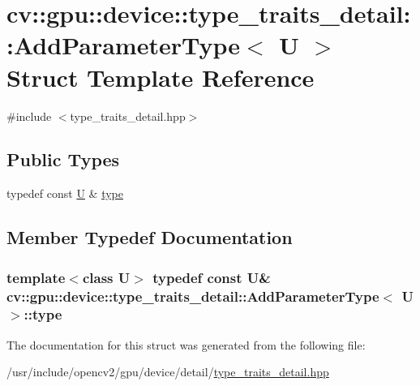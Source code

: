 \hypertarget{structcv_1_1gpu_1_1device_1_1type__traits__detail_1_1AddParameterType}{\section{cv\-:\-:gpu\-:\-:device\-:\-:type\-\_\-traits\-\_\-detail\-:\-:Add\-Parameter\-Type$<$ U $>$ Struct Template Reference}
\label{structcv_1_1gpu_1_1device_1_1type__traits__detail_1_1AddParameterType}
}


{\ttfamily \#include $<$type\-\_\-traits\-\_\-detail.\-hpp$>$}

\subsection*{Public Types}
\begin{DoxyCompactItemize}
\item 
typedef const \hyperlink{core__c_8h_aa9c521f41af9a5191e5e4b6ffbae211a}{U} \& \hyperlink{structcv_1_1gpu_1_1device_1_1type__traits__detail_1_1AddParameterType_ae21d6957928c27f53fadf3519a43140a}{type}
\end{DoxyCompactItemize}


\subsection{Member Typedef Documentation}
\hypertarget{structcv_1_1gpu_1_1device_1_1type__traits__detail_1_1AddParameterType_ae21d6957928c27f53fadf3519a43140a}{
\subsubsection[{type}]{\setlength{\rightskip}{0pt plus 5cm}template$<$class U$>$ typedef const {\bf U}\& {\bf cv\-::gpu\-::device\-::type\-\_\-traits\-\_\-detail\-::\-Add\-Parameter\-Type}$<$ {\bf U} $>$\-::{\bf type}}}\label{structcv_1_1gpu_1_1device_1_1type__traits__detail_1_1AddParameterType_ae21d6957928c27f53fadf3519a43140a}


The documentation for this struct was generated from the following file\-:\begin{DoxyCompactItemize}
\item 
/usr/include/opencv2/gpu/device/detail/\hyperlink{type__traits__detail_8hpp}{type\-\_\-traits\-\_\-detail.\-hpp}\end{DoxyCompactItemize}
